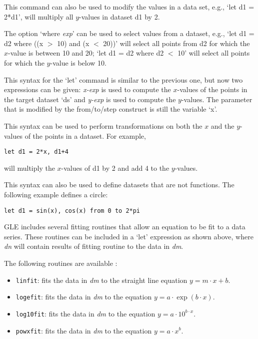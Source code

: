\begin{commanddescription}
This command can also be used to modify the values in a data set, e.g., `let d1 = 2*d1', will multiply all $y$-values in dataset d1 by 2.

The option `where {\it exp}' can be used to select values from a dataset, e.g., `let d1 = d2 where ((x $>$ 10) and (x $<$ 20))' will select all points from d2 for which the $x$-value is between 10 and 20; `let d1 = d2 where d2 $<$ 10' will select all points for which the $y$-value is below 10.

\item[{\sf let ds = {\it x-exp, y-exp {\sf [from} low{\sf] [to} high{\sf] [step} exp{\sf] [where} exp{\sf]}}}]

This syntax for the `let' command is similar to the previous one, but now two expressions can be given: {\it x-exp} is used to compute the $x$-values of the points in the target dataset `ds' and {\it y-exp} is used to compute the $y$-values. The parameter that is modified by the from/to/step construct is still the variable `x'.

This syntax can be used to perform transformations on both the $x$ and the $y$-values of the points in a dataset. For example,

\begin{Verbatim}
let d1 = 2*x, d1+4
\end{Verbatim}

will multiply the $x$-values of d1 by 2 and add 4 to the $y$-values. 

This syntax can also be used to define datasets that are not functions. The following example defines a circle:

\begin{Verbatim}
let d1 = sin(x), cos(x) from 0 to 2*pi
\end{Verbatim}

\item[{\sf let {\it dn} = [routine] {\it dm} [options] [{\it slopevar}] [{\it offsetvar}] [{\it rsqvar}]}]

GLE includes several fitting routines that allow an equation to be fit to a data series. These routines can be included in a `let' expression as shown above, where {\it dn} will contain results of fitting {\sf routine} to the data in {\it dm}.

The following routines are available :
\begin{itemize}
\item \texttt{linfit}: fits the data in \textit{dm} to the straight line equation $y = m \cdot x + b$.
\item \texttt{logefit}: fits the data in \textit{dm} to the equation $y = a \cdot \exp(b \cdot x)$.
\item \texttt{log10fit}: fits the data in \textit{dm} to the equation $y = a \cdot 10^{b \cdot x}$.
\item \texttt{powxfit}: fits the data in \textit{dm} to the equation $y = a \cdot x^b$.
\end{itemize}


\end{commanddescription}
